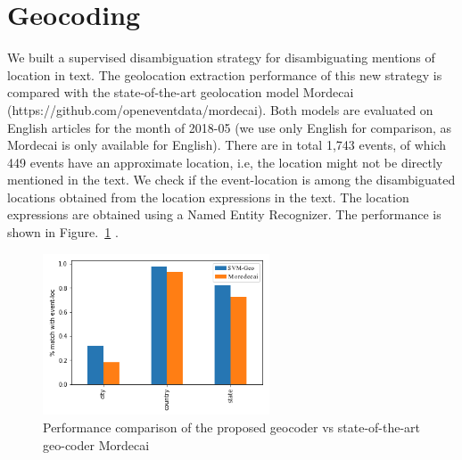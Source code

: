 \section{Geocoding}
We built a supervised disambiguation strategy for disambiguating mentions of location in text. The geolocation extraction performance of this new strategy is compared with the state-of-the-art geolocation model Mordecai (https://github.com/openeventdata/mordecai).  Both models are evaluated on English articles for the month of 2018-05 (we use only English for comparison, as Mordecai is only available for English). There are in total 1,743 events, of which 449 events have an approximate location, i.e, the location might not be directly mentioned in the text. We check if the event-location is among the disambiguated locations obtained from the location expressions in the text. The location expressions are obtained using a Named Entity Recognizer. The performance is shown in Figure.~\ref{fig:geoPerformance} .

\begin{figure}
    \centering
    \includegraphics[width=0.6\textwidth]{figures/Geo_metrics.png}
    \caption{Performance comparison of the proposed geocoder vs state-of-the-art geo-coder Mordecai}
    \label{fig:geoPerformance}
\end{figure}

